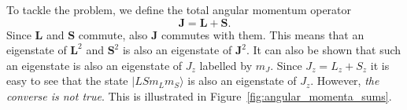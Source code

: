 




To tackle the problem, we define the total angular momentum operator 
\begin{equation}
\mathbf{J} = \mathbf{L} + \mathbf{S}.
\end{equation}
Since $\mathbf{L}$ and  $\mathbf{S}$ commute, also $\mathbf{J}$ commutes with them. This means that an eigenstate of $\mathbf{L}^2$ and $\mathbf{S}^2$ is also an eigenstate of $\mathbf{J}^2$. It can also be shown that such an eigenstate is also an eigenstate of $J_z$ labelled by $m_J$. Since $J_z = L_z + S_z$ it is easy to see that the state $|LSm_Lm_S\rangle$ is also an eigenstate of $J_z$. However, \emph{the converse is not true}. This is illustrated in Figure~\ref{fig:angular_momenta_sums}.

